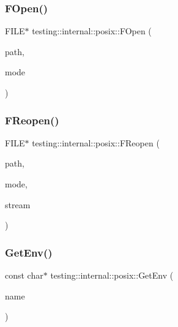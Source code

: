 \subsubsection{\texorpdfstring{FOpen()}{FOpen()}}
{\footnotesize\ttfamily F\+I\+LE$\ast$ testing\+::internal\+::posix\+::\+F\+Open (\begin{DoxyParamCaption}\item[{const char $\ast$}]{path,  }\item[{const char $\ast$}]{mode }\end{DoxyParamCaption})\hspace{0.3cm}{\ttfamily [inline]}}

\mbox{\label{namespacetesting_1_1internal_1_1posix_a9ef6d089cdae03f9d9e0e6d379c40703}} 
\subsubsection{\texorpdfstring{FReopen()}{FReopen()}}
{\footnotesize\ttfamily F\+I\+LE$\ast$ testing\+::internal\+::posix\+::\+F\+Reopen (\begin{DoxyParamCaption}\item[{const char $\ast$}]{path,  }\item[{const char $\ast$}]{mode,  }\item[{F\+I\+LE $\ast$}]{stream }\end{DoxyParamCaption})\hspace{0.3cm}{\ttfamily [inline]}}

\mbox{\label{namespacetesting_1_1internal_1_1posix_a1d5e3da5a27eed25986859fa83cafe95}} 
\subsubsection{\texorpdfstring{GetEnv()}{GetEnv()}}
{\footnotesize\ttfamily const char$\ast$ testing\+::internal\+::posix\+::\+Get\+Env (\begin{DoxyParamCaption}\item[{const char $\ast$}]{name }\end{DoxyParamCaption})\hspace{0.3cm}{\ttfamily [inline]}}

